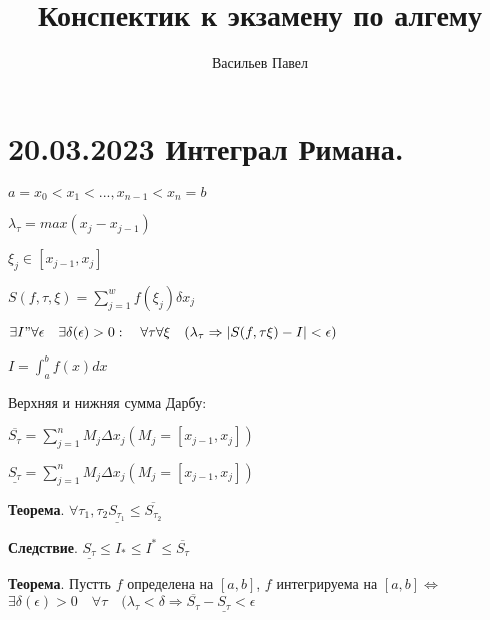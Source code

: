 \documentclass[a4paper]{article}
\title{Конспектик к экзамену по алгему}
\author{Васильев Павел}
\begin{document}
\section*{20.03.2023 Интеграл Римана.}

$a = x_0 < x_1 < ... ,x_{n-1} < x_n = b$

$\lambda_\tau = max(x_j-x_{j-1})$

$\xi_j \in [x_{j-1}, x_j]$

$S(f, \tau, \xi) = \sum_{j=1}^w f(\xi_j) \delta x_j$

$\exists I" \forall \epsilon \quad \exists \delta(\epsilon)>0: \quad \forall \tau \forall \xi \quad (\lambda_\tau \Rightarrow |S(f, \tau \xi) - I| < \epsilon)$

$I = \int_a^b f(x)dx$

Верхняя и нижняя сумма Дарбу:

$\displaystyle \overline{S_\tau} = \sum_{j=1}^n M_j \Delta x_j (M_j = [x_{j-1}, x_j])$

$\displaystyle \underline{S_\tau} = \sum_{j=1}^n M_j \Delta x_j (M_j = [x_{j-1}, x_j])$


\begin{htheorem}\textbf{Теорема}. $\forall \tau_1, \tau_2 \underline{S_{\tau_1}} \leq \overline{S_{\tau_2}}$
\end{htheorem}

\begin{htheorem}\textbf{Следствие}.
$\underline{S_{\tau}} \leq I_* \leq I^* \leq \overline{S_\tau}$
\end{htheorem}

\begin{htheorem}\textbf{Теорема}. Пустть $f$ определена на $[a,b]$, $f$ интегрируема на $[a,b] \Leftrightarrow$ $\exists \delta(\epsilon) > 0 \quad \forall \tau \quad (\lambda_\tau < \delta \Rightarrow \overline{S_\tau} - \underline{S_\tau} < \epsilon$
\end{htheorem}
\end{document}

